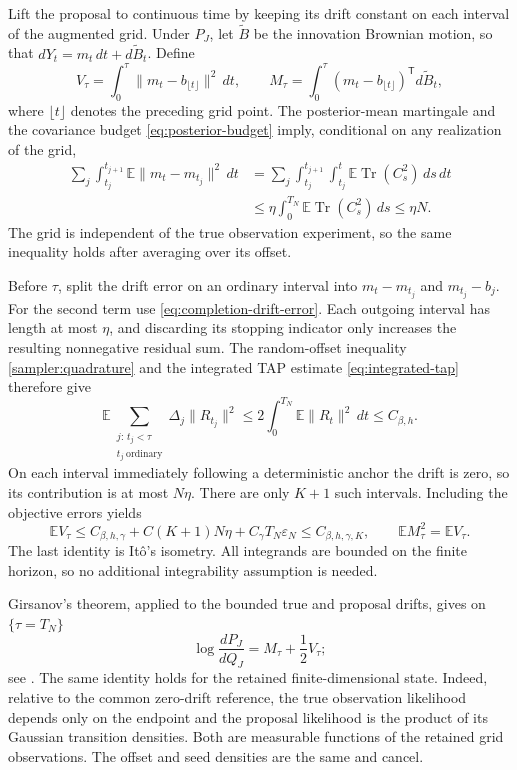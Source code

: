\documentclass[11pt,reqno]{amsart}
\begin{document}
Lift the proposal to continuous time by keeping its drift constant on
each interval of the augmented grid. Under $P_J$, let
$\widetilde B$ be the innovation Brownian motion, so that
$dY_t=m_t\,dt+d\widetilde B_t$. Define
\[
 V_\tau=\int_0^\tau\|m_t-b_{\lfloor t\rfloor}\|^2\,dt,
 \qquad
 M_\tau=\int_0^\tau(m_t-b_{\lfloor t\rfloor})^{\mathsf T}
                                      d\widetilde B_t,
\]
where $\lfloor t\rfloor$ denotes the preceding grid point.
The posterior-mean martingale and the covariance budget
\eqref{eq:posterior-budget} imply, conditional on any realization of
the grid,
\begin{align*}
 \sum_j\int_{t_j}^{t_{j+1}}
        \mathbb E\|m_t-m_{t_j}\|^2\,dt
 &=\sum_j\int_{t_j}^{t_{j+1}}
        \int_{t_j}^{t}\mathbb E\operatorname{Tr}(C_s^2)\,ds\,dt\\
 &\le\eta\int_0^{T_N}\mathbb E\operatorname{Tr}(C_s^2)\,ds
 \le\eta N.
\end{align*}
The grid is independent of the true observation experiment, so the
same inequality holds after averaging over its offset.

Before $\tau$, split the drift error on an ordinary interval into
$m_t-m_{t_j}$ and $m_{t_j}-b_j$. For the second term use
\eqref{eq:completion-drift-error}. Each outgoing interval has length
at most $\eta$, and discarding its stopping indicator only increases
the resulting nonnegative residual sum. The random-offset inequality
\eqref{sampler:quadrature} and the integrated TAP estimate
\eqref{eq:integrated-tap} therefore give
\[
 \mathbb E\sum_{\substack{j:\,t_j<\tau\\
                         t_j\ \mathrm{ordinary}}}
       \Delta_j\|R_{t_j}\|^2
 \le2\int_0^{T_N}\mathbb E\|R_t\|^2\,dt
 \le C_{\beta,h}.
\]
On each interval immediately following a deterministic anchor the
drift is zero, so its contribution is at most $N\eta$. There are
only $K+1$ such intervals. Including the objective errors yields
\begin{equation*}
 \mathbb E V_\tau
  \le C_{\beta,h,\gamma}
       +C(K+1)N\eta+C_\gamma T_N\varepsilon_N
  \le C_{\beta,h,\gamma,K},
 \qquad \mathbb E M_\tau^2=\mathbb E V_\tau.
\end{equation*}
The last identity is It\^o's isometry. All integrands are bounded on
the finite horizon, so no additional integrability assumption is needed.

Girsanov's theorem, applied to the bounded true and proposal drifts,
gives on $\{\tau=T_N\}$
\[
 \log\frac{dP_J}{dQ_J}=M_\tau+\frac12V_\tau;
\]
see \cite[Chapter~III, Section~5]{karatzas1991brownian}.
The same identity holds for the retained finite-dimensional state.
Indeed, relative to the common zero-drift reference, the true
observation likelihood depends only on the endpoint and the proposal
likelihood is the product of its Gaussian transition densities.
Both are measurable functions of the retained grid observations.
The offset and seed densities are the same and cancel.
\end{document}
